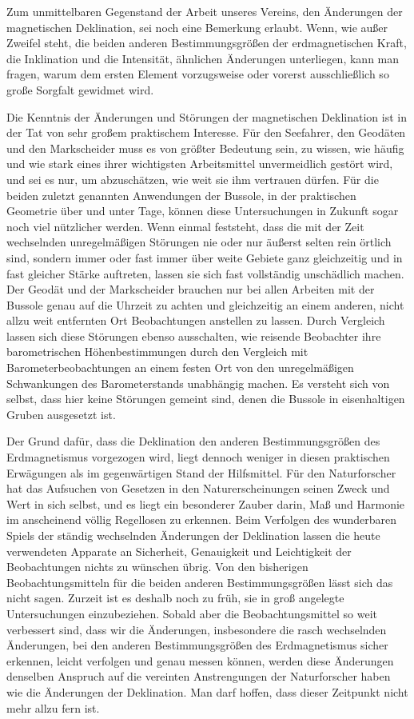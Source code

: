 Zum unmittelbaren Gegenstand der Arbeit unseres Vereins, den Änderungen der magnetischen Deklination, sei noch eine Bemerkung erlaubt. Wenn, wie außer Zweifel steht, die beiden anderen Bestimmungsgrößen der erdmagnetischen Kraft, die Inklination und die Intensität, ähnlichen Änderungen unterliegen, kann man fragen, warum dem ersten Element vorzugsweise oder vorerst ausschließlich so große Sorgfalt gewidmet wird.

Die Kenntnis der Änderungen und Störungen der magnetischen Deklination ist in der Tat von sehr großem praktischem Interesse. Für den Seefahrer, den Geodäten und den Markscheider muss es von größter Bedeutung sein, zu wissen, wie häufig und wie stark eines ihrer wichtigsten Arbeitsmittel unvermeidlich gestört wird, und sei es nur, um abzuschätzen, wie weit sie ihm vertrauen dürfen. Für die beiden zuletzt genannten Anwendungen der Bussole, in der praktischen Geometrie über und unter Tage, können diese Untersuchungen in Zukunft sogar noch viel nützlicher werden. Wenn einmal feststeht, dass die mit der Zeit wechselnden unregelmäßigen Störungen nie oder nur äußerst selten rein örtlich sind, sondern immer oder fast immer über weite Gebiete ganz gleichzeitig und in fast gleicher Stärke auftreten, lassen sie sich fast vollständig unschädlich machen. Der Geodät und der Markscheider brauchen nur bei allen Arbeiten mit der Bussole genau auf die Uhrzeit zu achten und gleichzeitig an einem anderen, nicht allzu weit entfernten Ort Beobachtungen anstellen zu lassen. Durch Vergleich lassen sich diese Störungen ebenso ausschalten, wie reisende Beobachter ihre barometrischen Höhenbestimmungen durch den Vergleich mit Barometerbeobachtungen an einem festen Ort von den unregelmäßigen Schwankungen des Barometerstands unabhängig machen. Es versteht sich von selbst, dass hier keine Störungen gemeint sind, denen die Bussole in eisenhaltigen Gruben ausgesetzt ist.

Der Grund dafür, dass die Deklination den anderen Bestimmungsgrößen des Erdmagnetismus vorgezogen wird, liegt dennoch weniger in diesen praktischen Erwägungen als im gegenwärtigen Stand der Hilfsmittel. Für den Naturforscher hat das Aufsuchen von Gesetzen in den Naturerscheinungen seinen Zweck und Wert in sich selbst, und es liegt ein besonderer Zauber darin, Maß und Harmonie im anscheinend völlig Regellosen zu erkennen. Beim Verfolgen des wunderbaren Spiels der ständig wechselnden Änderungen der Deklination lassen die heute verwendeten Apparate an Sicherheit, Genauigkeit und Leichtigkeit der Beobachtungen nichts zu wünschen übrig. Von den bisherigen Beobachtungsmitteln für die beiden anderen Bestimmungsgrößen lässt sich das nicht sagen. Zurzeit ist es deshalb noch zu früh, sie in groß angelegte Untersuchungen einzubeziehen. Sobald aber die Beobachtungsmittel so weit verbessert sind, dass wir die Änderungen, insbesondere die rasch wechselnden Änderungen, bei den anderen Bestimmungsgrößen des Erdmagnetismus sicher erkennen, leicht verfolgen und genau messen können, werden diese Änderungen denselben Anspruch auf die vereinten Anstrengungen der Naturforscher haben wie die Änderungen der Deklination. Man darf hoffen, dass dieser Zeitpunkt nicht mehr allzu fern ist.

